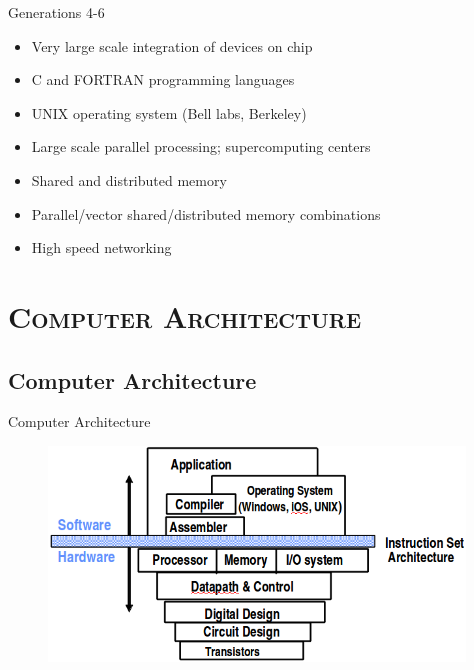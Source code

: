 \documentclass[xcolor=x11names,compress]{beamer}
\renewcommand{\(}{\begin{columns}}
\renewcommand{\)}{\end{columns}}
\newcommand{\<}[1]{\begin{column}{#1}}
\renewcommand{\>}{\end{column}}
\begin{document}
\begin{frame}{Generations 4-6}
\begin{itemize}
\item Very large scale integration of devices on chip
\item C and FORTRAN programming languages
\item UNIX operating system (Bell labs, Berkeley)
\item Large scale parallel processing; supercomputing centers
\item Shared and distributed memory
\item Parallel/vector shared/distributed memory combinations
\item High speed networking
\end{itemize}
\end{frame}

\section{\scshape Computer Architecture}
\subsection{Computer Architecture}
\begin{frame}{Computer Architecture}
 \begin{figure}
   \begin{center}
     \includegraphics[height=2.25in,clip]{ComputerArchitecture}
   \end{center}
 \end{figure}
\end{frame}
\end{document}
